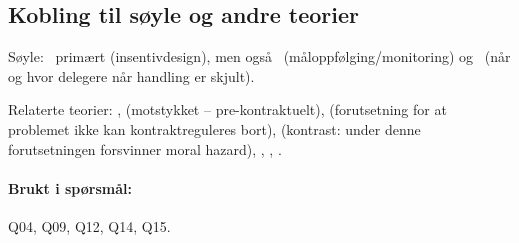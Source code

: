 \subsection*{Kobling til søyle og andre teorier}
Søyle: \SThree\ primært (insentivdesign), men også \STwo\ (måloppfølging/monitoring) og \SOne\ (når og hvor delegere når handling er skjult).

Relaterte teorier: ,  (motstykket -- pre-kontraktuelt),  (forutsetning for at problemet ikke kan kontraktreguleres bort),  (kontrast: under denne forutsetningen forsvinner moral hazard), , , .

\paragraph{Brukt i spørsmål:} Q04, Q09, Q12, Q14, Q15.
